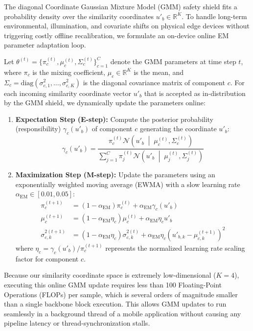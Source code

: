 The diagonal Coordinate Gaussian Mixture Model (GMM) safety shield fits a probability density over the similarity coordinates $u'_b \in \mathbb{R}^K$. To handle long-term environmental, illumination, and covariate shifts on physical edge devices without triggering costly offline recalibration, we formulate an on-device online EM parameter adaptation loop.

Let $\theta^{(t)} = \{\pi_c^{(t)}, \mu_c^{(t)}, \Sigma_c^{(t)}\}_{c=1}^C$ denote the GMM parameters at time step $t$, where $\pi_c$ is the mixing coefficient, $\mu_c \in \mathbb{R}^K$ is the mean, and $\Sigma_c = \text{diag}(\sigma_{c, 1}^2, \dots, \sigma_{c, K}^2)$ is the diagonal covariance matrix of component $c$. For each incoming similarity coordinate vector $u'_b$ that is accepted as in-distribution by the GMM shield, we dynamically update the parameters online:

\begin{enumerate}
    \item \textbf{Expectation Step (E-step):} Compute the posterior probability (responsibility) $\gamma_{c}(u'_b)$ of component $c$ generating the coordinate $u'_b$:
    \begin{equation}
        \gamma_{c}(u'_b) = \frac{\pi_c^{(t)} \mathcal{N}\left(u'_b \;\middle|\; \mu_c^{(t)}, \Sigma_c^{(t)}\right)}{\sum_{j=1}^C \pi_j^{(t)} \mathcal{N}\left(u'_b \;\middle|\; \mu_j^{(t)}, \Sigma_j^{(t)}\right)}
    \end{equation}
    \item \textbf{Maximization Step (M-step):} Update the parameters using an exponentially weighted moving average (EWMA) with a slow learning rate $\alpha_{\text{EM}} \in [0.01, 0.05]$:
    \begin{align}
        \pi_c^{(t+1)} &= (1 - \alpha_{\text{EM}}) \pi_c^{(t)} + \alpha_{\text{EM}} \gamma_{c}(u'_b) \\
        \mu_c^{(t+1)} &= (1 - \alpha_{\text{EM}} \eta_c) \mu_c^{(t)} + \alpha_{\text{EM}} \eta_c u'_b \\
        \sigma_{c, k}^{2 (t+1)} &= (1 - \alpha_{\text{EM}} \eta_c) \sigma_{c, k}^{2 (t)} + \alpha_{\text{EM}} \eta_c \left(u'_{b, k} - \mu_{c, k}^{(t+1)}\right)^2
    \end{align}
    where $\eta_c = \gamma_{c}(u'_b) / \pi_c^{(t+1)}$ represents the normalized learning rate scaling factor for component $c$.
\end{enumerate}
Because our similarity coordinate space is extremely low-dimensional ($K=4$), executing this online GMM update requires less than 100 Floating-Point Operations (FLOPs) per sample, which is several orders of magnitude smaller than a single backbone block execution. This allows GMM updates to run seamlessly in a background thread of a mobile application without causing any pipeline latency or thread-synchronization stalls.

